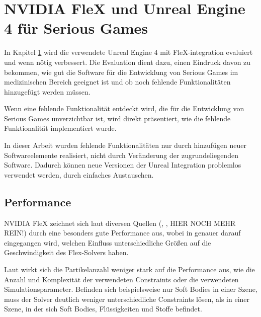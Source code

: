 \chapter{NVIDIA FleX und Unreal Engine 4 für Serious Games}
\label{chap_Flex_Engine}

In Kapitel \ref{chap_Flex_Engine} wird die verwendete Unreal Engine 4 mit FleX-integration evaluiert und wenn nötig verbessert. Die Evaluation dient dazu, einen Eindruck davon zu bekommen, wie gut die Software für die Entwicklung von Serious Games im medizinischen Bereich geeignet ist und ob noch fehlende Funktionalitäten hinzugefügt werden müssen. 

Wenn eine fehlende Funktionalität entdeckt wird, die für die Entwicklung von Serious Games unverzichtbar ist, wird direkt präsentiert, wie die fehlende Funktionalität implementiert wurde.

In dieser Arbeit wurden fehlende Funktionalitäten nur durch hinzufügen neuer Softwareelemente realisiert, nicht durch Veränderung der zugrundeliegenden Software. Dadurch können neue Versionen der Unreal Integration problemlos verwendet werden, durch einfaches Austauschen. 


\section{Performance}
\label{sec_performance}

NVIDIA FleX zeichnet sich laut diversen Quellen (\cite{FlexD3D}, \cite{UPP}, HIER NOCH MEHR REIN!) durch eine besonders gute Performance aus, wobei in \cite{FlexD3D} genauer darauf eingegangen wird, welchen Einfluss unterschiedliche Größen auf die Geschwindigkeit des Flex-Solvers haben. 

Laut \cite{FlexD3D} wirkt sich die Partikelanzahl weniger stark auf die Performance aus, wie die Anzahl und Komplexität der verwendeten Constraints oder die verwendeten Simulationsparameter. Befinden sich beispielsweise nur Soft Bodies in einer Szene, muss der Solver deutlich weniger unterschiedliche Constraints lösen, als in einer Szene, in der sich Soft Bodies, Flüssigkeiten und Stoffe befindet.

